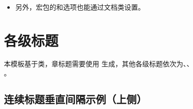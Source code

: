 \documentclass[doctor, vlined, ]{DissertUESTC}
\begin{document}
\begin{itemize}
\begin{itemize}
			追求公式字体均为Times New Roman的使用者可采用选项。后两种选项均基于\href{https://mirrors.pku.edu.cn/ctan/macros/xetex/latex/mathspec/mathspec.pdf}{\ttfamily\color{DarkRed}}宏包实现，在本人有限的测试实践中，只有它能做到真正意义上的Times New Roman。（2025.01.31）

			\textbf{P.s. 1：}因为\href{https://mirrors.pku.edu.cn/ctan/macros/xetex/latex/mathspec/mathspec.pdf}{\ttfamily\color{DarkRed}}宏包本身的特性，使用Times New Roman作为公式字体需要用户付出更多精力。举个例子，你想排版，那么你会发现和之间的间隔很小，两者发生了重叠，这时候需要你手动用插入空格，变成。因此，和选项均存在类似瑕疵，届时就需要仔细查阅\href{https://mirrors.pku.edu.cn/ctan/macros/xetex/latex/mathspec/mathspec.pdf}{\ttfamily\color{DarkRed}}的宏包文档。

			\textbf{P.s. 2：}其实，规范并未对公式字体作强制要求，即便审查系统识别到公式字体不是Times New Roman，它也只是抛出提醒而非错误，不会造成格式审查不通过。只是实在有太多人问怎么公式字体不是Times New Roman，既然有部分同学喜欢Times New Roman，那本模板秉承兼容并包的原则，将选择权交给使用者。

			\item 另外，\href{https://mirrors.sustech.edu.cn/CTAN/macros/latex/contrib/algorithm2e/doc/algorithm2e.pdf}{\ttfamily\color{DarkRed}}宏包的和选项也能通过文档类设置。
		\end{itemize}
	\end{itemize}
	
	\section{各级标题}
	
	本模板基于类，章标题需要使用 生成，其他各级标题依次为、、\\ 。

	\subsection{连续标题垂直间隔示例（上侧）}\vspace*{-10bp}
\end{document}
